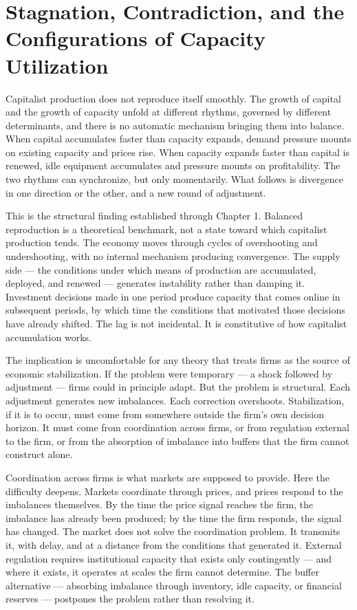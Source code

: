 \section{Stagnation, Contradiction, and the Configurations of Capacity Utilization}

Capitalist production does not reproduce itself smoothly. The growth of capital and the growth of capacity unfold at different rhythms, governed by different determinants, and there is no automatic mechanism bringing them into balance. When capital accumulates faster than capacity expands, demand pressure mounts on existing capacity and prices rise. When capacity expands faster than capital is renewed, idle equipment accumulates and pressure mounts on profitability. The two rhythms can synchronize, but only momentarily. What follows is divergence in one direction or the other, and a new round of adjustment.

This is the structural finding established through Chapter 1. Balanced reproduction is a theoretical benchmark, not a state toward which capitalist production tends. The economy moves through cycles of overshooting and undershooting, with no internal mechanism producing convergence. The supply side — the conditions under which means of production are accumulated, deployed, and renewed — generates instability rather than damping it. Investment decisions made in one period produce capacity that comes online in subsequent periods, by which time the conditions that motivated those decisions have already shifted. The lag is not incidental. It is constitutive of how capitalist accumulation works.

The implication is uncomfortable for any theory that treats firms as the source of economic stabilization. If the problem were temporary — a shock followed by adjustment — firms could in principle adapt. But the problem is structural. Each adjustment generates new imbalances. Each correction overshoots. Stabilization, if it is to occur, must come from somewhere outside the firm's own decision horizon. It must come from coordination across firms, or from regulation external to the firm, or from the absorption of imbalance into buffers that the firm cannot construct alone.

Coordination across firms is what markets are supposed to provide. Here the difficulty deepens. Markets coordinate through prices, and prices respond to the imbalances themselves. By the time the price signal reaches the firm, the imbalance has already been produced; by the time the firm responds, the signal has changed. The market does not solve the coordination problem. It transmits it, with delay, and at a distance from the conditions that generated it. External regulation requires institutional capacity that exists only contingently — and where it exists, it operates at scales the firm cannot determine. The buffer alternative — absorbing imbalance through inventory, idle capacity, or financial reserves — postpones the problem rather than resolving it.

